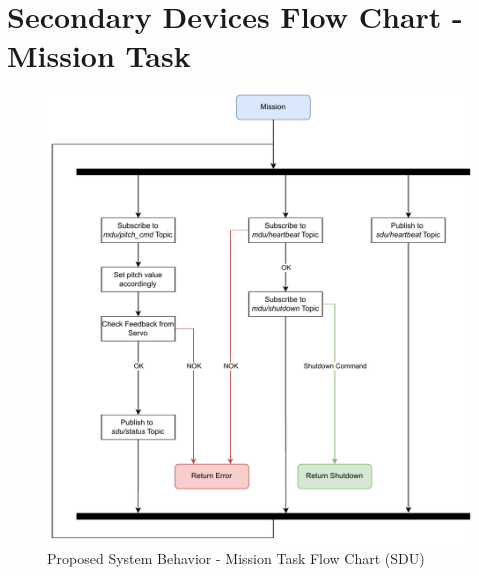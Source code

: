 
\chapter{Secondary Devices Flow Chart - Mission Task} %

\label{AppendixB}

\begin{figure}[H]
    \centering
    \includegraphics[scale=0.75,angle=270,origin=c]{appendices/assets/SDU_MISSION.pdf}
    \caption{Proposed System Behavior - Mission Task Flow Chart (SDU)}
    \label{fig:SDU_MISSION}
\end{figure}

